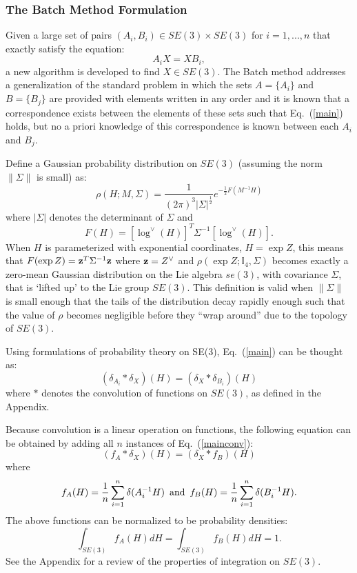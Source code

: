 \documentclass[twocolumn,10pt]{asme2ej}
\newcommand{\half}{\frac{1}{2}}
\begin{document}
\subsubsection{The Batch Method Formulation}
Given a large set of pairs $(A_i,B_i) \in SE(3) \times SE(3)$ for $i =1,...,n$ that exactly satisfy the equation:
\begin{equation} A_i X = X B_i , \label{main} \end{equation}
a new algorithm is developed to find $X \in SE(3)$. The Batch method addresses a generalization of the standard problem in which
the sets $A=\{A_i\}$ and $B =\{B_j\}$ are provided with elements written in any order and it is known that a correspondence exists between the elements of these sets such that Eq.~(\ref{main}) holds, but no a priori knowledge of this correspondence is known between each $A_i$ and $B_j$.

Define a Gaussian probability distribution on $SE(3)$ (assuming the norm $\|\Sigma\|$ is small) as:
$$ \rho(H; M, \Sigma) = \frac{1}{(2\pi)^3 |\Sigma|^{\half}} e^{-\half F(M^{-1} H)} $$
where $|\Sigma|$ denotes the determinant of $\Sigma$ and
$$ F(H) = [\log^{\vee}(H)]^T \Sigma^{-1} [\log^{\vee}(H)]. $$
When $H$ is parameterized with exponential coordinates, $H = \exp Z$, this means that
$F(\exp Z) = {\bf z}^T \Sigma^{-1}  {\bf z}$ where ${\bf z} = Z^{\vee}$ and
$\rho(\exp Z; \mathbb{I}_4, \Sigma)$ becomes exactly a zero-mean Gaussian distribution on the Lie algebra $se(3)$, with covariance $\Sigma$, that is `lifted up' to the Lie group $SE(3)$. This definition is valid when $\|\Sigma\|$ is small enough that the tails of the distribution decay rapidly enough such that the value of $\rho$
becomes negligible before they ``wrap around'' due to the topology of $SE(3)$. 

Using formulations of probability theory on SE(3), Eq.~(\ref{main}) can be thought as:
\begin{equation} (\delta_{A_i} * \delta_X)(H) = (\delta_X * \delta_{B_i})(H) \label{mainconv} \end{equation}
where $*$ denotes the convolution of functions on $SE(3)$, as defined in the Appendix.

Because convolution is a linear operation on functions, the following equation can be obtained by adding all $n$ instances of Eq.~(\ref{mainconv}):
\begin{equation} (f_A * \delta_X)(H) = (\delta_X * f_B)(H) \label{mainconvall} \end{equation}
where $$ f_A(H) = \frac{1}{n} \sum_{i=1}^{n} \delta(A_i^{-1} H) \,\,\, {\rm and} \,\,\, f_B(H) = \frac{1}{n} \sum_{i=1}^{n} \delta(B_i^{-1} H). $$
The above functions can be normalized
to be probability densities:
$$ \int_{SE(3)} f_A(H) dH = \int_{SE(3)} f_B(H) dH = 1. $$
See the Appendix for a review of the properties of integration on $SE(3)$.
\end{document}
